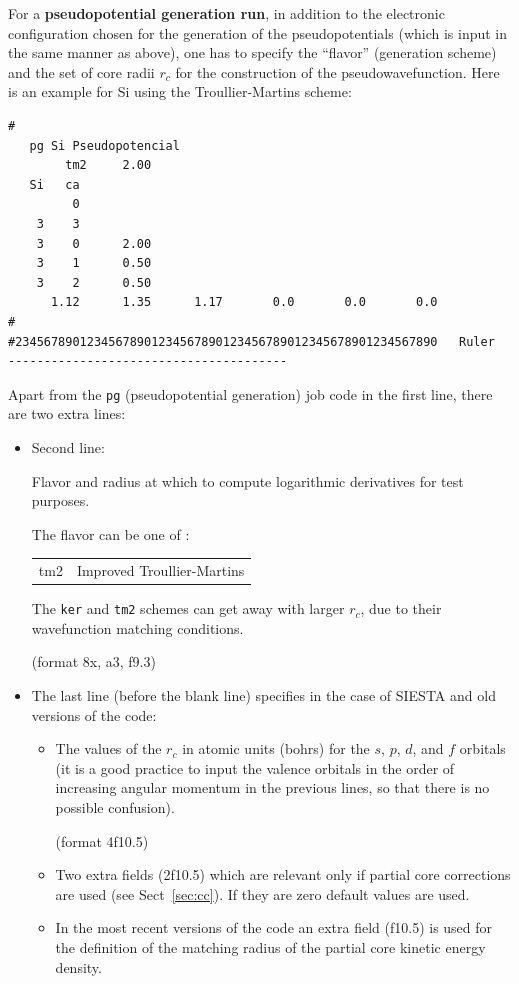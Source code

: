\documentclass[11pt]{article}
\begin{document}
For a {\bf pseudopotential generation run}, in addition to the
electronic configuration chosen for the generation of the
pseudopotentials (which is input in the same manner as above), one has
to specify the ``flavor'' (generation scheme) and the set of core
radii $r_c$ for the construction of the pseudowavefunction. Here is an
example for Si using the Troullier-Martins scheme:

\begin{verbatim}
#
   pg Si Pseudopotencial
        tm2     2.00
   Si   ca
         0
    3    3
    3    0      2.00
    3    1      0.50
    3    2      0.50
      1.12      1.35      1.17       0.0       0.0       0.0
#
#23456789012345678901234567890123456789012345678901234567890   Ruler
---------------------------------------
\end{verbatim}

Apart from the {\tt pg} (pseudopotential generation) job code in the
first line, there are two extra lines:

\begin{itemize}
\item Second line:

Flavor and radius at which to compute logarithmic
derivatives for test purposes.

The flavor can be one of :
\begin{tabular}{ll}
	tm2	&Improved Troullier-Martins\\
\end{tabular}

The {\tt ker} and {\tt tm2} schemes can get away with larger $r_c$,
due to their wavefunction matching conditions.

(format 8x, a3, f9.3)

\item The last line (before the blank line) specifies in the case of \textsc{SIESTA}
and old versions of the code:

\begin{itemize}
\item The values of the $r_c$ in atomic units (bohrs) for the $s$,
$p$, $d$, and $f$ orbitals (it is a good practice to input the valence
orbitals in the order of increasing angular momentum in the previous lines,
so that there is no possible confusion).

(format 4f10.5)

\item Two extra fields (2f10.5) which are relevant only if partial
core corrections are used (see Sect~\ref{sec:cc}).  If they are zero
default values are used.

\item In the most recent versions of the code an extra field (f10.5) is used
for the definition of the matching radius of the partial core kinetic energy density.

\end{itemize}

\end{itemize}
\end{document}
